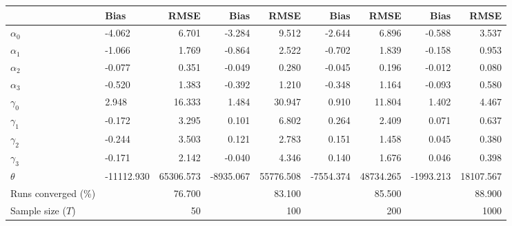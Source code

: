 
\begin{tabular}[t]{llrrrrrrr}
\toprule
  & Bias & RMSE & Bias & RMSE & Bias & RMSE & Bias & RMSE\\
\midrule
$\alpha_{0}$ & -4.062 & 6.701 & -3.284 & 9.512 & -2.644 & 6.896 & -0.588 & 3.537\\
$\alpha_{1}$ & -1.066 & 1.769 & -0.864 & 2.522 & -0.702 & 1.839 & -0.158 & 0.953\\
$\alpha_{2}$ & -0.077 & 0.351 & -0.049 & 0.280 & -0.045 & 0.196 & -0.012 & 0.080\\
$\alpha_{3}$ & -0.520 & 1.383 & -0.392 & 1.210 & -0.348 & 1.164 & -0.093 & 0.580\\
$\gamma_{0}$ & 2.948 & 16.333 & 1.484 & 30.947 & 0.910 & 11.804 & 1.402 & 4.467\\
$\gamma_{1}$ & -0.172 & 3.295 & 0.101 & 6.802 & 0.264 & 2.409 & 0.071 & 0.637\\
$\gamma_{2}$ & -0.244 & 3.503 & 0.121 & 2.783 & 0.151 & 1.458 & 0.045 & 0.380\\
$\gamma_{3}$ & -0.171 & 2.142 & -0.040 & 4.346 & 0.140 & 1.676 & 0.046 & 0.398\\
$\theta$ & -11112.930 & 65306.573 & -8935.067 & 55776.508 & -7554.374 & 48734.265 & -1993.213 & 18107.567\\
Runs converged (\%) &  & 76.700 &  & 83.100 &  & 85.500 &  & 88.900\\
Sample size ($T$) &  & 50 &  & 100 &  & 200 &  & 1000\\
\bottomrule
\end{tabular}
